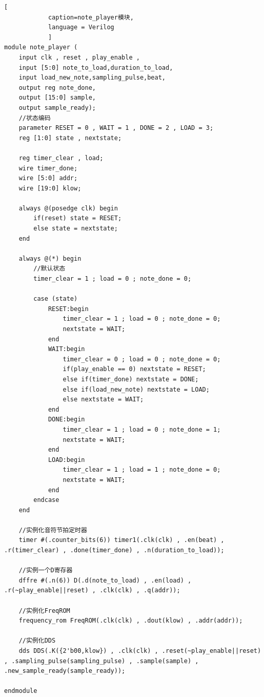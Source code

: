 \documentclass{ctexart}
\begin{document}
        \begin{lstlisting}[
            caption=note_player模块,
            language = Verilog
            ]
module note_player (
    input clk , reset , play_enable , 
    input [5:0] note_to_load,duration_to_load,
    input load_new_note,sampling_pulse,beat,
    output reg note_done,
    output [15:0] sample,
    output sample_ready);
    //状态编码
    parameter RESET = 0 , WAIT = 1 , DONE = 2 , LOAD = 3;
    reg [1:0] state , nextstate;
            
    reg timer_clear , load;
    wire timer_done;
    wire [5:0] addr;
    wire [19:0] klow;
            
    always @(posedge clk) begin
        if(reset) state = RESET;
        else state = nextstate;
    end
            
    always @(*) begin
        //默认状态
        timer_clear = 1 ; load = 0 ; note_done = 0;
                    
        case (state)
            RESET:begin
                timer_clear = 1 ; load = 0 ; note_done = 0;
                nextstate = WAIT;
            end  
            WAIT:begin
                timer_clear = 0 ; load = 0 ; note_done = 0;
                if(play_enable == 0) nextstate = RESET;
                else if(timer_done) nextstate = DONE;
                else if(load_new_note) nextstate = LOAD;
                else nextstate = WAIT;
            end
            DONE:begin
                timer_clear = 1 ; load = 0 ; note_done = 1;
                nextstate = WAIT;
            end
            LOAD:begin
                timer_clear = 1 ; load = 1 ; note_done = 0;
                nextstate = WAIT;
            end
        endcase
    end
            
    //实例化音符节拍定时器
    timer #(.counter_bits(6)) timer1(.clk(clk) , .en(beat) , .r(timer_clear) , .done(timer_done) , .n(duration_to_load));          
            
    //实例一个D寄存器
    dffre #(.n(6)) D(.d(note_to_load) , .en(load) , .r(~play_enable||reset) , .clk(clk) , .q(addr));
            
    //实例化FreqROM
    frequency_rom FreqROM(.clk(clk) , .dout(klow) , .addr(addr));
            
    //实例化DDS
    dds DDS(.K({2'b00,klow}) , .clk(clk) , .reset(~play_enable||reset) , .sampling_pulse(sampling_pulse) , .sample(sample) , .new_sample_ready(sample_ready));
                
endmodule
        \end{lstlisting}
\end{document}
